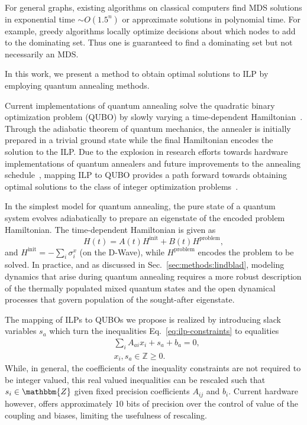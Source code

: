 \documentclass[prd,twocolumn,tightenlines,preprintnumbers,showpacs,superscriptaddress,notitlepage,nofootinbib,eqsecnum,floatfix,longbibliography,aps,10pt]{revtex4-1}
\begin{document}
For general graphs, existing algorithms on classical computers find MDS solutions in exponential time $\sim O( 1.5^n)$ \cite{Fomin2009, vanRooij2009} or approximate solutions in polynomial time. For example, greedy algorithms locally optimize decisions about which nodes to add to the dominating set.
Thus one is guaranteed to find a dominating set but not necessarily an MDS.

In this work, we present a method to obtain optimal solutions to ILP by employing quantum annealing methods.

Current implementations of quantum annealing solve the quadratic binary optimization problem (QUBO) by slowly varying a time-dependent Hamiltonian~\cite{1998PhRvE..58.5355K, 2000quant.ph..1106F, RevModPhys.80.1061}.
Through the adiabatic theorem of quantum mechanics, the annealer is initially prepared in a trivial ground state while the final Hamiltonian encodes the solution to the ILP.
Due to the explosion in research efforts towards hardware implementations of quantum annealers and future improvements to the annealing schedule~\cite{doi:10.7566/JPSJ.89.044001}, mapping ILP to QUBO provides a path forward towards obtaining optimal solutions to the class of integer optimization problems~\cite{2018Glover}.

In the simplest model for quantum annealing, the pure state of a quantum system evolves adiabatically to prepare an eigenstate of the encoded problem Hamiltonian. The time-dependent Hamiltonian is given as
\begin{equation}
 H(t) = A(t) H^{\textrm{init}} + B(t) H^{\textrm{problem}}, \label{eq:tdhamiltonian}
\end{equation}
and $H^\textrm{init}=-\sum_i\sigma^x_i$ (on the D-Wave), while $H^\textrm{problem}$ encodes the problem to be solved. In practice, and as discussed in Sec.~\ref{sec:methods:lindblad}, modeling dynamics that arise during quantum annealing requires a more robust description of the thermally populated mixed quantum states and the open dynamical processes that govern population of the sought-after eigenstate.

The mapping of ILPs to QUBOs we propose is realized by introducing slack variables $s_a$ which turn the inequalities Eq.~\eqref{eq:ilp-constraints} to equalities
\begin{align}
  \label{eq:ilp:slack}
  & \sum_i A_{a i}x_i + s_a + b_a = 0, \\
  & x_i, s_a \in \mathbb{Z} \geq 0.
\end{align}
While, in general, the coefficients of the inequality constraints are not required to be integer valued, this real valued inequalities can be rescaled such that $s_i \in \mathbbm{Z}$ given fixed precision coefficients $A_{ij}$ and $b_i$. Current hardware however, offers approximately 10 bits of precision over the control of value of the coupling and biases, limiting the usefulness of rescaling.
\end{document}
